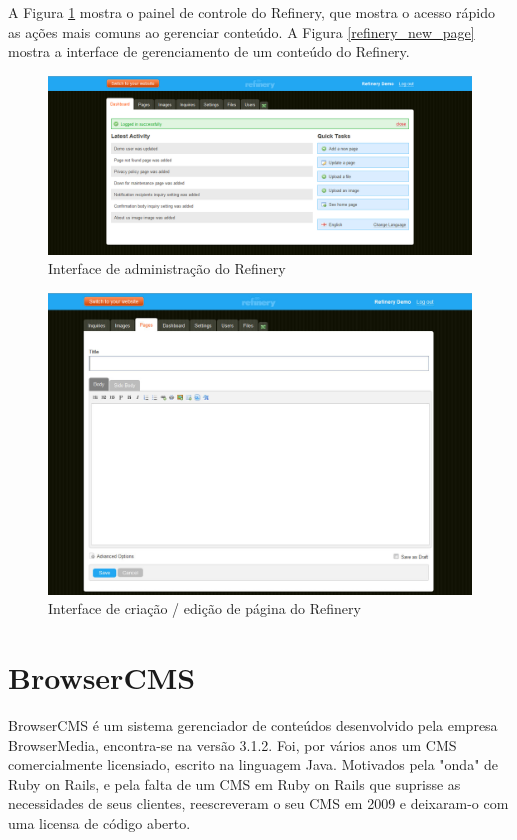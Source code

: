 A Figura \ref{fig:refinery_admin} mostra o painel de controle do Refinery, que mostra o acesso rápido as ações mais comuns ao gerenciar conteúdo. A Figura \ref{refinery_new_page} mostra a interface de gerenciamento de um conteúdo do Refinery.

\begin{figure}[here]
\includegraphics[width=150mm]{images/refinery_admin.png}
\caption{Interface de administração do Refinery}
\label{fig:refinery_admin}
\end{figure}

\begin{figure}[here]
\includegraphics[width=150mm]{images/refinery_new_page.jpg}
\caption{Interface de criação / edição de página do Refinery}
\label{fig:refinery_new_page}
\end{figure}

\section{BrowserCMS}

BrowserCMS é um sistema gerenciador de conteúdos desenvolvido pela empresa BrowserMedia, encontra-se na versão 3.1.2. Foi, por vários anos um CMS comercialmente licensiado, escrito na linguagem Java. Motivados pela "onda" de Ruby on Rails, e pela falta de um CMS em Ruby on Rails que suprisse as necessidades de seus clientes, reescreveram o seu CMS em 2009 e deixaram-o com uma licensa de código aberto.

